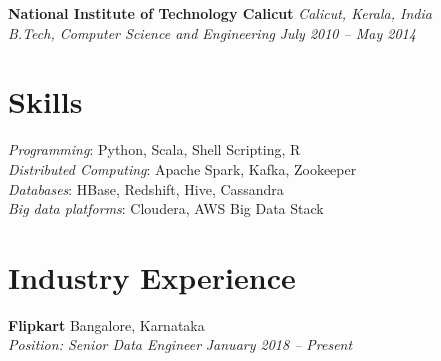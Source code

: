 \documentclass[margin,line]{resume}
\begin{document}
\begin{resume}
    \textbf{National Institute of Technology Calicut} \hfill \textit{Calicut, Kerala, India} \vspace{1mm}\\\vspace{1mm}%
    \textsl{B.Tech, Computer Science and Engineering} \hfill \textit{ July 2010 -- May 2014}\vspace{-3mm}\\\vspace{-1mm}%
    

   \section{\mysidestyle Skills} 

 \textit{Programming}: Python, Scala, Shell Scripting, R\\
 \textit{Distributed Computing}: Apache Spark, Kafka, Zookeeper \\
\textit{Databases}: HBase, Redshift, Hive, Cassandra \\
\textit{Big data platforms}: Cloudera, AWS Big Data Stack \\ 



    \section{\mysidestyle Industry Experience}
    
      \textbf{Flipkart} 				\hfill  Bangalore, Karnataka \\
    \textit{Position: Senior Data Engineer } 			\hfill \textit{January 2018 -- Present}
    

\end{resume}
\end{document}
